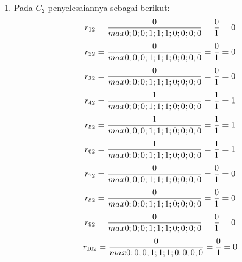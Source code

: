 \begin{enumerate}
\item Pada $C_{2}$ penyelesaiannya sebagai berikut:
\begin{displaymath}
r_{12} = \frac{0}{max {0;0;0;1;1;1;0;0;0;0}} = \frac{0}{1} = 0\\
\end {displaymath}
\begin{displaymath}
r_{22} = \frac{0}{max {0;0;0;1;1;1;0;0;0;0}} = \frac{0}{1} = 0\\
\end{displaymath}
\begin{displaymath}
r_{32} = \frac{0}{max {0;0;0;1;1;1;0;0;0;0}} = \frac{0}{1} = 0\\
\end {displaymath}
\begin{displaymath}
r_{42} = \frac{1}{max {0;0;0;1;1;1;0;0;0;0}} = \frac{1}{1} = 1\\
\end {displaymath}
\begin{displaymath}
r_{52} = \frac{1}{max {0;0;0;1;1;1;0;0;0;0}} = \frac{1}{1} = 1\\
\end {displaymath}
\begin{displaymath}
r_{62} = \frac{1}{max {0;0;0;1;1;1;0;0;0;0}} = \frac{1}{1} = 1\\
\end {displaymath}
\begin{displaymath}
r_{72} = \frac{0}{max {0;0;0;1;1;1;0;0;0;0}} = \frac{0}{1} = 0\\
\end {displaymath}
\begin{displaymath}
r_{82} = \frac{0}{max {0;0;0;1;1;1;0;0;0;0}} = \frac{0}{1} = 0\\
\end {displaymath}
\begin{displaymath}
r_{92} = \frac{0}{max {0;0;0;1;1;1;0;0;0;0}} = \frac{0}{1} = 0\\
\end {displaymath}
\begin{displaymath}
r_{102} = \frac{0}{max {0;0;0;1;1;1;0;0;0;0}} = \frac{0}{1} = 0\\
\end {displaymath}


\end{enumerate}
